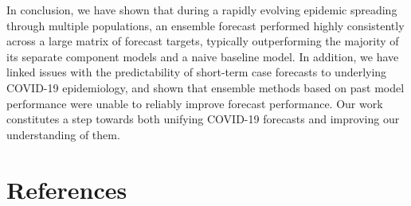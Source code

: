 \documentclass[
]{article}
\begin{document}
In conclusion, we have shown that during a rapidly evolving epidemic spreading through multiple populations, an ensemble forecast performed highly consistently across a large matrix of forecast targets, typically outperforming the majority of its separate component models and a naive baseline model. In addition, we have linked issues with the predictability of short-term case forecasts to underlying COVID-19 epidemiology, and shown that ensemble methods based on past model performance were unable to reliably improve forecast performance. Our work constitutes a step towards both unifying COVID-19 forecasts and improving our understanding of them.

\hypertarget{references}{%
\section{References}\label{references}}
\end{document}
